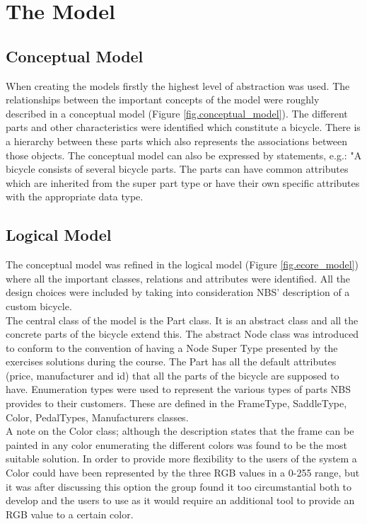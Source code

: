 \section{The Model}
\label{sec.logical_model}

\subsection{Conceptual Model}
\noindent When creating the models firstly the highest level of 
abstraction was used. The relationships between the important concepts 
of the model were roughly described in a conceptual model (Figure \ref{fig.conceptual_model}). 
The different parts and other characteristics were identified which 
constitute a bicycle. There is a hierarchy between these parts which 
also represents the associations between those objects. The conceptual 
model can also be expressed by statements, e.g.: "A bicycle consists of 
several bicycle parts. The parts can have common attributes which are 
inherited from the super part type or have their own specific attributes 
with the appropriate data type. 

\subsection{Logical Model}
\noindent The conceptual model was refined in the logical model (Figure \ref{fig.ecore_model})
where all the important classes, relations and attributes were identified. 
All the design choices were included by taking into consideration NBS' 
description of a custom bicycle.\\

\noindent The central class of the model is the Part class. It is an abstract
class and all the concrete parts of the bicycle extend this. The abstract Node 
class was introduced to conform to the convention of having a Node Super 
Type presented by the exercises solutions during the course. 
The Part has all the default attributes (price, manufacturer and id) 
that all the parts of the bicycle are supposed to have. Enumeration types 
were used to represent the various types of parts NBS provides to their 
customers. These are defined in the FrameType, SaddleType, Color, 
PedalTypes, Manufacturers classes.\\

\noindent A note on the Color class; although the description states that the 
frame can be painted in any color enumerating the different colors was 
found to be the most suitable solution. In order to provide more 
flexibility to the users of the system a Color could have been 
represented by the three RGB values in a 0-255 range, but it was 
after discussing this option the group found it too circumstantial 
both to develop and the users to use as it would require an additional 
tool to provide an RGB value to a certain color.\\

